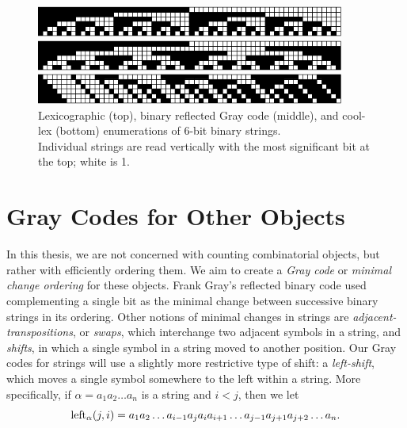 \begin{figure}
    \centering
\includegraphics[width=4in]{BLX6-cropped.pdf} 

\includegraphics[width=4in]{BRGC6-cropped.pdf} 

\includegraphics[width=4in]{BCLX6-cropped.pdf} 

    \caption{Lexicographic (top), binary reflected Gray code (middle), and cool-lex (bottom) enumerations of 6-bit binary strings. \\ 
    Individual strings are read vertically with the most significant bit at the top; white is 1.
    }
    \label{binary}
\end{figure}

\section{Gray Codes for Other Objects} \label{sec:intro_Graycodes}
In this thesis, we are not concerned with counting combinatorial objects, but rather with efficiently ordering them.  We aim to create a \emph{Gray code} or \emph{minimal change ordering} for these objects.  Frank Gray's reflected binary code used complementing a single bit as the minimal change between successive binary strings in its ordering.  Other notions of minimal changes in strings are \emph{adjacent-transpositions}, or \emph{swaps}, which interchange two adjacent symbols in a string, and \emph{shifts}, in which a single symbol in a string moved to another position. Our Gray codes for strings will use a slightly more restrictive type of shift: a \emph{left-shift}, which moves a single symbol somewhere to the left within a string. 
More specifically, if $\alpha = a_1 a_2 \ldots a_n$ is a string and $i < j$, then we let
\begin{equation}
    \lshiftindex[\alpha]{j}{i} = a_1 a_2 \ldots a_{i-1} a_j a_{i} a_{i+1} \ldots a_{j-1} a_{j+1} a_{j+2} \ldots a_n. \label{eq:leftdef}
\end{equation}


